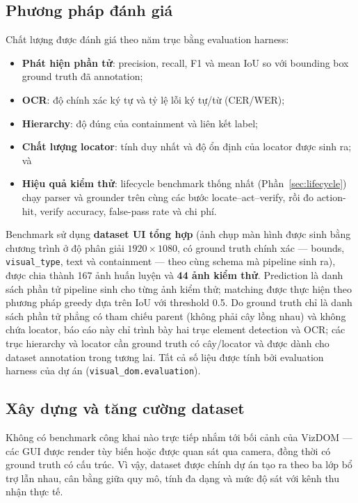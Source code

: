 \documentclass[11pt,a4paper]{article}
\newcommand{\code}[1]{\texttt{#1}}
\begin{document}
\subsection{Phương pháp đánh giá}
Chất lượng được đánh giá theo năm trục bằng evaluation harness:
\begin{itemize}[leftmargin=1.4em]
  \item \textbf{Phát hiện phần tử}: precision, recall, F1 và mean IoU so với
        bounding box ground truth đã annotation;
  \item \textbf{OCR}: độ chính xác ký tự và tỷ lệ lỗi ký tự/từ (CER/WER);
  \item \textbf{Hierarchy}: độ đúng của containment và liên kết label;
  \item \textbf{Chất lượng locator}: tính duy nhất và độ ổn định của locator được
        sinh ra; và
  \item \textbf{Hiệu quả kiểm thử}: lifecycle benchmark thống nhất
        (Phần~\ref{sec:lifecycle}) chạy parser và grounder trên cùng các bước
        locate--act--verify, rồi đo action-hit, verify accuracy, false-pass rate và
        chi phí.
\end{itemize}
Benchmark sử dụng \textbf{dataset UI tổng hợp} (ảnh chụp màn hình được sinh bằng
chương trình ở độ phân giải $1920\times1080$, có ground truth chính xác --- bounds,
\code{visual\_type}, text và containment --- theo cùng schema mà pipeline sinh ra),
được chia thành 167 ảnh huấn luyện và \textbf{44 ảnh kiểm thử}. Prediction là danh
sách phần tử pipeline sinh cho từng ảnh kiểm thử; matching được thực hiện theo
phương pháp greedy dựa trên IoU với threshold 0.5. Do ground truth chỉ là danh sách
phần tử phẳng có tham chiếu parent (không phải cây lồng nhau) và không chứa locator,
báo cáo này chỉ trình bày hai trục element detection và OCR; các trục hierarchy và
locator cần ground truth có cây/locator và được dành cho dataset annotation trong
tương lai. Tất cả số liệu được tính bởi evaluation harness của dự án
(\code{visual\_dom.evaluation}).

\subsection{Xây dựng và tăng cường dataset}
Không có benchmark công khai nào trực tiếp nhắm tới bối cảnh của VizDOM --- các
GUI được render tùy biến hoặc được quan sát qua camera, đồng thời có ground truth
có cấu trúc. Vì vậy, dataset được chính dự án tạo ra theo ba lớp bổ trợ lẫn nhau,
cân bằng giữa quy mô, tính đa dạng và mức độ sát với kênh thu nhận thực tế.
\end{document}
